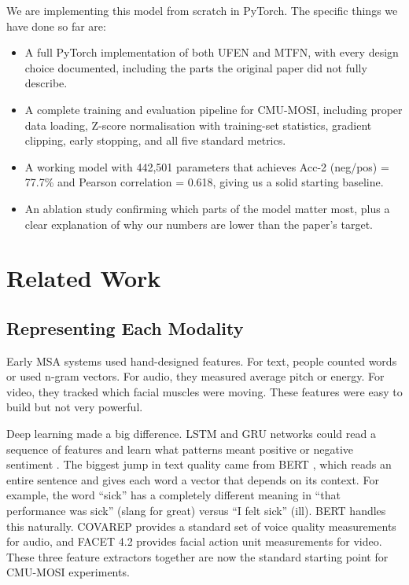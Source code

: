 \documentclass[11pt,twocolumn]{article}
\begin{document}
We are implementing this model from scratch in PyTorch. The specific things we have done so far are:

\begin{itemize}
    \item A full PyTorch implementation of both UFEN and MTFN, with every design choice documented, including the parts the original paper did not fully describe.
    \item A complete training and evaluation pipeline for CMU-MOSI, including proper data loading, Z-score normalisation with training-set statistics, gradient clipping, early stopping, and all five standard metrics.
    \item A working model with 442,501 parameters that achieves Acc-2 (neg/pos) = 77.7\% and Pearson correlation = 0.618, giving us a solid starting baseline.
    \item An ablation study confirming which parts of the model matter most, plus a clear explanation of why our numbers are lower than the paper's target.
\end{itemize}

\section{Related Work}
\label{sec:related}

\subsection{Representing Each Modality}

Early MSA systems used hand-designed features. For text, people counted words or used n-gram vectors. For audio, they measured average pitch or energy. For video, they tracked which facial muscles were moving. These features were easy to build but not very powerful.

Deep learning made a big difference. LSTM and GRU networks could read a sequence of features and learn what patterns meant positive or negative sentiment \citep{poria2017review}. The biggest jump in text quality came from BERT \citep{devlin2019bert}, which reads an entire sentence and gives each word a vector that depends on its context. For example, the word ``sick'' has a completely different meaning in ``that performance was sick'' (slang for great) versus ``I felt sick'' (ill). BERT handles this naturally. COVAREP \citep{degottex2014covarep} provides a standard set of voice quality measurements for audio, and FACET 4.2 provides facial action unit measurements for video. These three feature extractors together are now the standard starting point for CMU-MOSI experiments.
\end{document}

